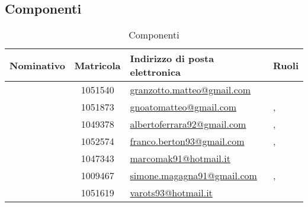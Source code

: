 \subsection{Componenti}
\begin{table}[H]
	\begin{center}
		\setlength{\extrarowheight}{\jot}
		\begin{tabular}{|c|c|p{5cm}|p{4.3cm}|}
			\hline
			\textbf{Nominativo} & \textbf{Matricola} & \raggedright \textbf{Indirizzo di posta elettronica} & \textbf{Ruoli} \\[1ex]
			\hline
	 		\GR	& 1051540	& \href{mailto:granzotto.matteo@gmail.com}{granzotto.matteo@gmail.com} 	& \Ver 	\\[1ex]
			\hline
			\GN		& 1051873	& \href{mailto:gnoatomatteo@gmail.com}{gnoatomatteo@gmail.com} 			& \Ver, \Prog 	\\[1ex]
			\hline
			\AF		& 1049378	& \href{mailto:albertoferrara92@gmail.com}{albertoferrara92@gmail.com} 	& \Ver, \Prog 	\\[1ex]
			\hline
			\FB 		& 1052574	& \href{mailto:franco.berton93@gmail.com}{franco.berton93@gmail.com} 	& \Ver, \Prog	\\[1ex]
			\hline
			\MP		& 1047343	& \href{mailto:marcomak91@hotmail.it}{marcomak91@hotmail.it} 			& \Ver	\\[1ex]
			\hline
			\SM		& 1009467	& \href{mailto:simone.magagna91@gmail.com}{simone.magagna91@gmail.com} 	& \Ver, \Res 	\\[1ex]
			\hline
			\MV		& 1051619	& \href{mailto:varots93@hotmail.it}{varots93@hotmail.it} & \Ver \\[1ex]
			\hline	
		\end{tabular}
	\end{center}
	\caption{Componenti}
\end{table}

